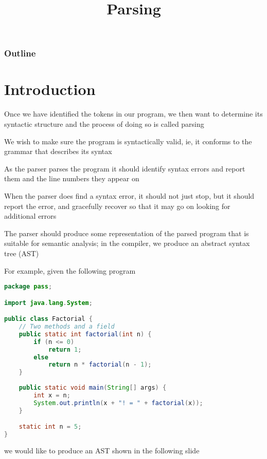 \documentclass[8pt,a4paper,compress,handout]{beamer}
\title{Parsing}
\date{}
\begin{document}
\begin{frame}
\vfill
\titlepage
\end{frame}

\begin{frame}
\frametitle{Outline}
\tableofcontents
\end{frame}

\section{Introduction}
\begin{frame}[fragile]
\pause

Once we have identified the tokens in our program, we then want to determine its syntactic structure and the process of doing so is called parsing

\pause
\bigskip

We wish to make sure the program is syntactically valid, ie, it conforms to the grammar that describes its syntax

\pause
\bigskip

As the parser parses the program it should identify syntax errors and report them and the line numbers they appear on

\pause
\bigskip

When the parser does find a syntax error, it should not just stop, but it should report the error, and gracefully recover so that it may go on looking for additional errors

\pause
\bigskip

The parser should produce some representation of the parsed program that is suitable for semantic analysis; in the \jmm compiler, we produce an abstract syntax tree (AST)
\end{frame}

\begin{frame}[fragile]
\pause

For example, given the following \jmm program

\begin{lstlisting}[language=Java]
package pass;

import java.lang.System;

public class Factorial {
    // Two methods and a field
    public static int factorial(int n) {
        if (n <= 0)
            return 1;
        else
            return n * factorial(n - 1);
    }
    
    public static void main(String[] args) {
        int x = n;
        System.out.println(x + "! = " + factorial(x));
    }

    static int n = 5;
}
\end{lstlisting}
we would like to produce an AST shown in the following slide
\end{frame}
\end{document}
